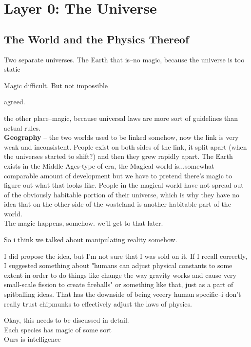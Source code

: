\chapter*{Layer 0: The Universe}

\section*{The World and the Physics Thereof}

\R Two separate universes. The Earth that is--no magic, because the universe is
too static

\A Magic difficult. But not impossible  

\R agreed.  

\R the other place--magic, because universal laws are more sort of guidelines
than actual rules. \\ \textbf{Geography} -- the two worlds used to be linked somehow,
now the link is very weak and inconsistent. People exist on both sides of the
link, it split apart (when the universes started to shift?) and then they grew
rapidly apart.  The Earth exists in the Middle Ages-type of era, the Magical
world is...somewhat comparable amount of development but we have to pretend
there's magic to figure out what that looks like. People in the magical world
have not spread out of the obviously habitable portion of their universe, which
is why they have no idea that on the other side of the wasteland is another
habitable part of the world. \\  

\R The magic happens, somehow. we'll get to that later.  

\A So i think we talked about manipulating reality somehow.  

\R I did propose the idea, but I'm not sure that I was sold on it.  If I recall
correctly, I suggested something about "humans can adjust physical constants to
some extent in order to do things like change the way gravity works and cause
very small-scale fission to create fireballs" or something like that, just as a
part of spitballing ideas.  That has the downside of being veeery human
specific--i don't really trust chipmunks to effectively adjust the laws of
physics.  

\A Okay, this needs to be discussed in detail. \\  

\R
Each species has magic of some sort \\
Ours is intelligence 
 

